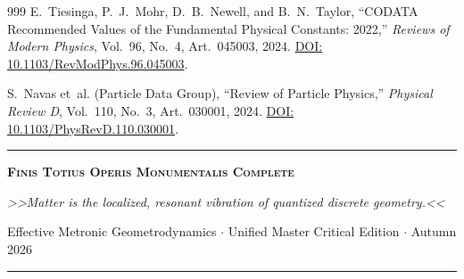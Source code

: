 \documentclass[
    12pt,
    a4paper,
    headings=normal,
    twoside=false,
    open=any,
    parskip=half
]{scrbook}
\begin{document}
\begin{thebibliography}{999}
E.~Tiesinga, P.~J.~Mohr, D.~B.~Newell, and B.~N.~Taylor, ``CODATA Recommended Values of the Fundamental Physical Constants: 2022,'' \textit{Reviews of Modern Physics}, Vol.~96, No.~4, Art.~045003, 2024. \href{https://doi.org/10.1103/RevModPhys.96.045003}{DOI: 10.1103/RevModPhys.96.045003}.

S.~Navas et~al. (Particle Data Group), ``Review of Particle Physics,'' \textit{Physical Review D}, Vol.~110, No.~3, Art.~030001, 2024. \href{https://doi.org/10.1103/PhysRevD.110.030001}{DOI: 10.1103/PhysRevD.110.030001}.

\end{thebibliography}

\vspace{3.0em}

\begin{center}
    {\color{maincolor}\rule{0.75\textwidth}{1.6pt}}\par\vspace{0.6cm}
    {\Large\sffamily\bfseries\scshape\color{maincolor} Finis Totius Operis Monumentalis Complete}\par\vspace{0.35cm}
    {\large\itshape\color{secondarycolor!95!black} >>Matter is the localized, resonant vibration of quantized discrete geometry.<<}\par\vspace{0.25cm}
    {\small\sffamily\color{mediumgray} Effective Metronic Geometrodynamics $\cdot$ Unified Master Critical Edition $\cdot$ Autumn 2026}\par\vspace{0.6cm}
    {\color{secondarycolor}\rule{0.45\textwidth}{1.0pt}}
\end{center}
\end{document}
